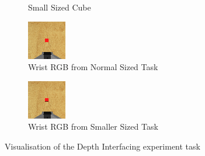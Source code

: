 \begin{figure}[htpb]
\begin{subfigure}{0.4\linewidth}
    \caption{Small Sized Cube}\label{subfig:small-grasp}
  \end{subfigure}
  \begin{subfigure}{0.4\linewidth}
    \centering
    \includegraphics[width=0.7\linewidth]{assets/depth-interfacing/normal-size-wrist.png}
    \caption{Wrist RGB from Normal Sized Task}\label{subfig:normal-rgb}
  \end{subfigure}
  \hfill
  \begin{subfigure}{0.4\linewidth}
    \centering
    \includegraphics[width=0.7\linewidth]{assets/depth-interfacing/smaller-wrist.png}
    \caption{Wrist RGB from Smaller Sized Task}\label{subfig:small-rgb}
  \end{subfigure}
  \caption{Visualisation of the Depth Interfacing experiment task}\label{fig:di-task}
\end{figure}

